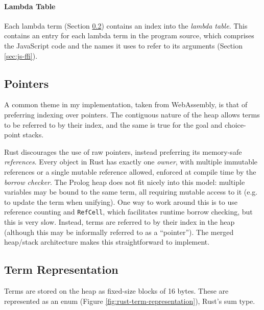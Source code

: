 \vspace*{-2em}

\paragraph{Lambda Table} Each lambda term (Section \ref{sec:term-representation}) contains an index into the \emph{lambda table}. This contains an entry for each lambda term in the program source, which comprises the JavaScript code and the names it uses to refer to its arguments (Section \ref{sec:js-ffi}).

\subsection{Pointers}

\label{sec:pointers}

A common theme in my implementation, taken from WebAssembly, is that of preferring indexing over pointers. The contiguous nature of the heap allows terms to be referred to by their index, and the same is true for the goal and choice-point stacks.

Rust discourages the use of raw pointers, instead preferring its memory-safe \emph{references}. Every object in Rust has exactly one \emph{owner}, with multiple immutable references or a single mutable reference allowed, enforced at compile time by the \emph{borrow checker}. The Prolog heap does not fit nicely into this model: multiple variables may be bound to the same term, all requiring mutable access to it (e.g. to update the term when unifying). One way to work around this is to use reference counting and \texttt{RefCell}, which facilitates runtime borrow checking, but this is very slow. Instead, terms are referred to by their index in the heap (although this may be informally referred to as a ``pointer''). The merged heap/stack architecture makes this straightforward to implement.

\subsection{Term Representation}

\label{sec:term-representation}

Terms are stored on the heap as fixed-size blocks of 16 bytes. These are represented as an enum (Figure \ref{fig:rust-term-representation}), Rust's sum type.

